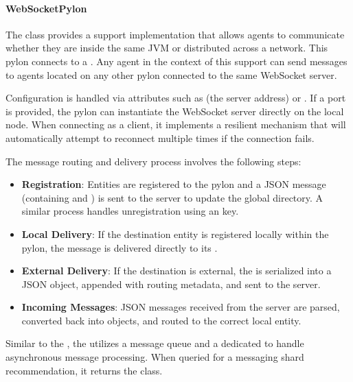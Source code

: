 \documentclass{article}
\begin{document}
\paragraph{WebSocketPylon}

The  class provides a support implementation that allows agents to communicate whether they are inside the same JVM or distributed across a network. This pylon connects to a . Any agent in the context of this support can send messages to agents located on any other pylon connected to the same WebSocket server.

Configuration is handled via attributes such as  (the server address) or . If a port is provided, the pylon can instantiate the WebSocket server directly on the local node. When connecting as a client, it implements a resilient mechanism that will automatically attempt to reconnect multiple times if the connection fails.

The message routing and delivery process involves the following steps:
\begin{itemize}
    \item \textbf{Registration}: Entities are registered to the pylon and a JSON message (containing  and ) is sent to the server to update the global directory. A similar process handles unregistration using an  key.
    \item \textbf{Local Delivery}: If the destination entity is registered locally within the pylon, the message is delivered directly to its .
    \item \textbf{External Delivery}: If the destination is external, the  is serialized into a JSON object, appended with routing metadata, and sent to the server.
    \item \textbf{Incoming Messages}: JSON messages received from the server are parsed, converted back into  objects, and routed to the correct local entity.
\end{itemize}

Similar to the , the  utilizes a message queue and a dedicated  to handle asynchronous message processing. When queried for a messaging shard recommendation, it returns the  class.

\end{document}
